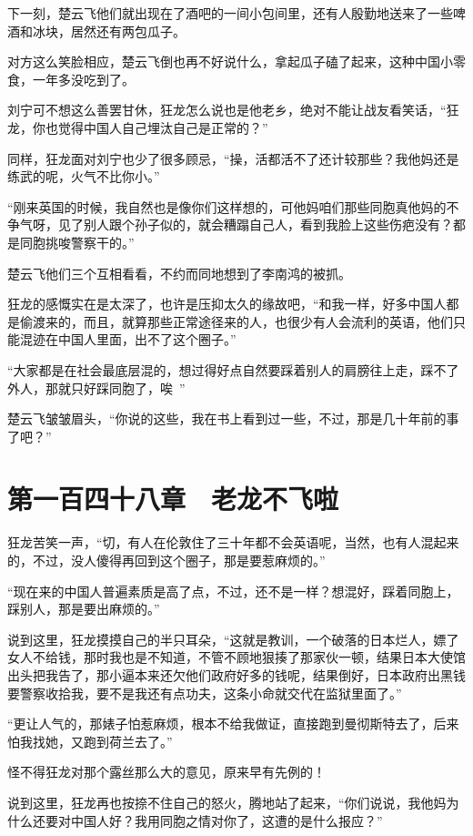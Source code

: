 下一刻，楚云飞他们就出现在了酒吧的一间小包间里，还有人殷勤地送来了一些啤酒和冰块，居然还有两包瓜子。

对方这么笑脸相应，楚云飞倒也再不好说什么，拿起瓜子磕了起来，这种中国小零食，一年多没吃到了。

刘宁可不想这么善罢甘休，狂龙怎么说也是他老乡，绝对不能让战友看笑话，“狂龙，你也觉得中国人自己埋汰自己是正常的？”

同样，狂龙面对刘宁也少了很多顾忌，“操，活都活不了还计较那些？我他妈还是练武的呢，火气不比你小。”

“刚来英国的时候，我自然也是像你们这样想的，可他妈咱们那些同胞真他妈的不争气呀，见了别人跟个孙子似的，就会糟蹋自己人，看到我脸上这些伤疤没有？都是同胞挑唆警察干的。”

楚云飞他们三个互相看看，不约而同地想到了李南鸿的被抓。

狂龙的感慨实在是太深了，也许是压抑太久的缘故吧，“和我一样，好多中国人都是偷渡来的，而且，就算那些正常途径来的人，也很少有人会流利的英语，他们只能混迹在中国人里面，出不了这个圈子。”

“大家都是在社会最底层混的，想过得好点自然要踩着别人的肩膀往上走，踩不了外人，那就只好踩同胞了，唉~”

楚云飞皱皱眉头，“你说的这些，我在书上看到过一些，不过，那是几十年前的事了吧？”

\section{第一百四十八章　老龙不飞啦}

狂龙苦笑一声，“切，有人在伦敦住了三十年都不会英语呢，当然，也有人混起来的，不过，没人傻得再回到这个圈子，那是要惹麻烦的。”

“现在来的中国人普遍素质是高了点，不过，还不是一样？想混好，踩着同胞上，踩别人，那是要出麻烦的。”

说到这里，狂龙摸摸自己的半只耳朵，“这就是教训，一个破落的日本烂人，嫖了女人不给钱，那时我也是不知道，不管不顾地狠揍了那家伙一顿，结果日本大使馆出头把我告了，那小逼本来还欠他们政府好多的钱呢，结果倒好，日本政府出黑钱要警察收拾我，要不是我还有点功夫，这条小命就交代在监狱里面了。”

“更让人气的，那婊子怕惹麻烦，根本不给我做证，直接跑到曼彻斯特去了，后来怕我找她，又跑到荷兰去了。”

怪不得狂龙对那个露丝那么大的意见，原来早有先例的！

说到这里，狂龙再也按捺不住自己的怒火，腾地站了起来，“你们说说，我他妈为什么还要对中国人好？我用同胞之情对你了，这遭的是什么报应？”

